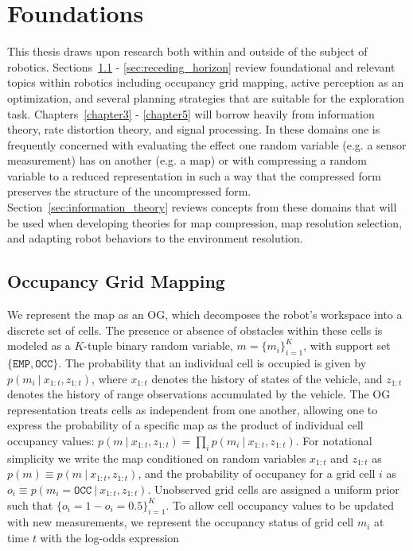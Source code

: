 \chapter{Foundations}
\label{chapter2}

This thesis draws upon research both within and outside of the subject of robotics.
Sections~\ref{sec:occ_grid_mapping} - \ref{sec:receding_horizon} review
foundational and relevant topics within robotics including occupancy grid mapping,
active perception as an optimization, and several planning strategies that are suitable for the
exploration task. Chapters~\ref{chapter3} - \ref{chapter5} will borrow heavily from
information theory, rate distortion theory, and signal processing. In these
domains one is frequently concerned with evaluating the effect one random
variable (e.g. a sensor measurement) has on
another (e.g. a map) or with compressing a random variable to a reduced
representation in such a way that the compressed form preserves the structure of the
uncompressed form.
Section~\ref{sec:information_theory} reviews concepts from
these domains that will be used when developing theories for map
compression, map resolution selection, and adapting robot behaviors to the
environment resolution.

\section{Occupancy Grid Mapping}
\label{sec:occ_grid_mapping}

We represent the map as an OG, which decomposes the robot's workspace into a discrete set of cells. The presence or absence of obstacles within these cells is modeled as a $K$-tuple binary random variable, $m = \{m_{i}\}_{i=1}^{K}$, with support set $\{\texttt{EMP}, \texttt{OCC}\}$. The probability that an individual cell is occupied is given by $p\left(m_{i} \ \vert \ x_{1:t}, z_{1:t}\right)$, where $x_{1:t}$ denotes the history of states of the vehicle, and $z_{1:t}$ denotes the history of range observations accumulated by the vehicle. The OG representation treats cells as independent from one another, allowing one to express the probability of a specific map as the product of individual cell occupancy values: $p\left(m \ \vert \ x_{1:t}, z_{1:t}\right) = \prod_{i} p\left(m_{i} \ \vert \ x_{1:t}, z_{1:t}\right)$. For notational simplicity we write the map conditioned on random variables $x_{1:t}$ and $z_{1:t}$ as $p\left(m\right) \equiv p\left(m \ \vert \ x_{1:t}, z_{1:t}\right)$, and the probability of occupancy for a grid cell $i$ as $o_{i}\equiv p\left(m_{i}=\texttt{OCC}\ \vert \ x_{1:t}, z_{1:t}\right)$. Unobserved grid cells are assigned a uniform prior such that $\{o_{i} = 1 - o_{i} = 0.5\}_{i=1}^{K}$. To allow cell occupancy values to be updated with new measurements, we represent the occupancy status of grid cell $m_i$ at time $t$ with the log-odds expression
%

